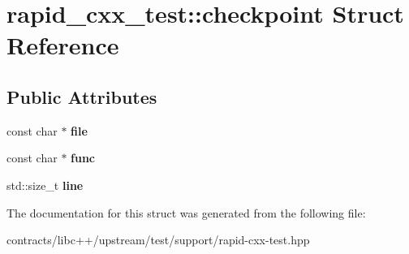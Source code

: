 \hypertarget{structrapid__cxx__test_1_1checkpoint}{}\section{rapid\+\_\+cxx\+\_\+test\+:\+:checkpoint Struct Reference}
\label{structrapid__cxx__test_1_1checkpoint}
\subsection*{Public Attributes}
\begin{DoxyCompactItemize}
\item 
\mbox{\label{structrapid__cxx__test_1_1checkpoint_a850854103a4d8406568cf0a6a8bbf814}} 
const char $\ast$ {\bfseries file}
\item 
\mbox{\label{structrapid__cxx__test_1_1checkpoint_aa63d3e9c6c67b7d1a06760a9a429d521}} 
const char $\ast$ {\bfseries func}
\item 
\mbox{\label{structrapid__cxx__test_1_1checkpoint_a528bdc77111ca566f9ac47e15a62fe47}} 
std\+::size\+\_\+t {\bfseries line}
\end{DoxyCompactItemize}


The documentation for this struct was generated from the following file\+:\begin{DoxyCompactItemize}
\item 
contracts/libc++/upstream/test/support/rapid-\/cxx-\/test.\+hpp\end{DoxyCompactItemize}

